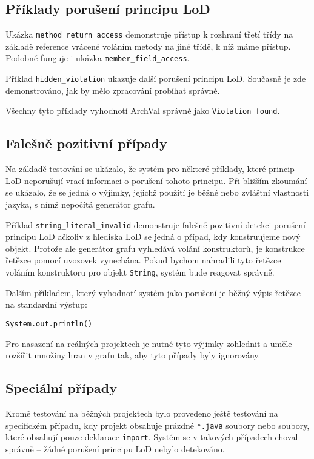 \subsection{Příklady porušení principu LoD}

Ukázka \verb+method_return_access+ demonstruje přístup k rozhraní třetí třídy na základě reference vrácené voláním metody na jiné třídě, k níž máme přístup. Podobně funguje i ukázka \verb+member_field_access+.

Příklad \verb+hidden_violation+ ukazuje další porušení principu LoD. Současně je zde demonstrováno, jak by mělo zpracování probíhat správně.

Všechny tyto příklady vyhodnotí ArchVal správně jako \verb+Violation found+.

\subsection{Falešně pozitivní případy}

Na základě testování se ukázalo, že systém pro některé příklady, které princip LoD neporušují vrací informaci o porušení tohoto principu. Při bližším zkoumání se ukázalo, že se jedná o výjimky, jejichž použití je běžné nebo zvláštní vlastnosti jazyka, s nímž nepočítá generátor grafu.

Příklad \verb+string_literal_invalid+ demonstruje falešně pozitivní detekci porušení principu LoD ačkoliv z hlediska LoD se jedná o případ, kdy konstruujeme nový objekt. Protože ale generátor grafu vyhledává volání konstruktorů, je konstrukce řetězce pomocí uvozovek vynechána. Pokud bychom nahradili tyto řetězce voláním konstruktoru pro objekt \verb+String+, systém bude reagovat správně.

Dalším příkladem, který vyhodnotí systém jako porušení je běžný výpis řetězce na standardní výstup:

\begin{verbatim}
System.out.println()
\end{verbatim}

Pro nasazení na reálných projektech je nutné tyto výjimky zohlednit a uměle rozšířit množiny hran v grafu tak, aby tyto případy byly ignorovány.

\subsection{Speciální případy}

Kromě testování na běžných projektech bylo provedeno ještě testování na specifickém případu, kdy projekt obsahuje prázdné \verb+*.java+ soubory nebo soubory, které obsahují pouze deklarace \verb+import+. Systém se v takových případech choval správně -- žádné porušení principu LoD nebylo detekováno.
